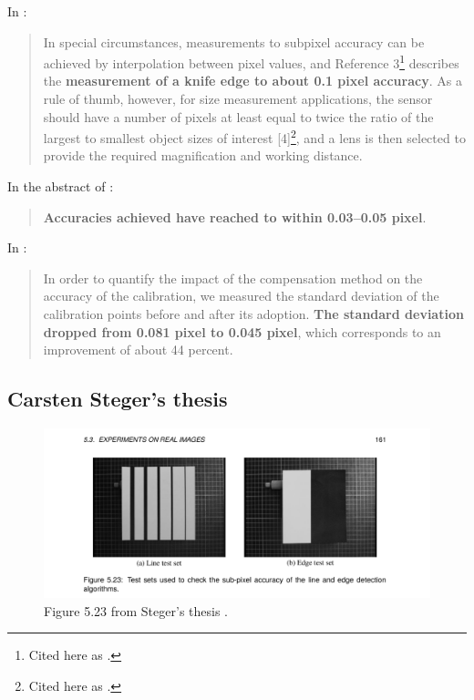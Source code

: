 \documentclass[a4paper,12pt]{article}
\begin{document}
In \cite{eren2014measurement}:
\begin{quotation}
In special circumstances, measurements to subpixel accuracy can be achieved by
interpolation between pixel values, and Reference 3\footnote{Cited here as \cite{knives}.} describes the \textbf{measurement of a knife edge to about
0.1 pixel accuracy}. As a rule of thumb, however, for size measurement applications, the sensor should
have a number of pixels at least equal to twice the ratio of the largest to smallest object sizes of interest
[4]\footnote{Cited here as \cite{hopwood1980design}.}, and a lens is then selected to provide the required magnification and working distance.
\end{quotation}

In the abstract of \cite{MIKHAIL198463}:
\begin{quotation}
\textbf{Accuracies achieved have reached to within 0.03–0.05 pixel}.
\end{quotation}

In \cite{632986}:
\begin{quotation}
In order to quantify the impact of the compensation method on
the accuracy of the calibration, we measured the standard deviation
of the calibration points before and after its adoption. \textbf{The
standard deviation dropped from 0.081 pixel to 0.045 pixel}, which
corresponds to an improvement of about 44 percent.
\end{quotation}

\subsection{Carsten Steger's thesis}

\begin{figure}
  \centering
  \includegraphics[width=\textwidth]{Steger_Thesis_Fig5_23}
  \caption{Figure 5.23 from Steger's thesis \cite{Steger}.}
\end{figure}
\end{document}
